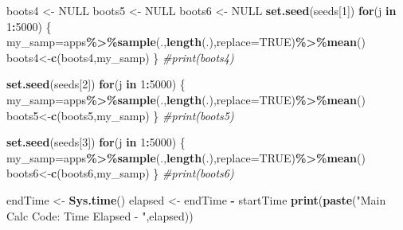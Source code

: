 \documentclass[
]{article}
\newenvironment{Shaded}{\begin{snugshade}}{\end{snugshade}}
\newcommand{\AttributeTok}[1]{\textcolor[rgb]{0.13,0.29,0.53}{#1}}
\newcommand{\CommentTok}[1]{\textcolor[rgb]{0.56,0.35,0.01}{\textit{#1}}}
\newcommand{\ConstantTok}[1]{\textcolor[rgb]{0.56,0.35,0.01}{#1}}
\newcommand{\ControlFlowTok}[1]{\textcolor[rgb]{0.13,0.29,0.53}{\textbf{#1}}}
\newcommand{\DecValTok}[1]{\textcolor[rgb]{0.00,0.00,0.81}{#1}}
\newcommand{\FunctionTok}[1]{\textcolor[rgb]{0.13,0.29,0.53}{\textbf{#1}}}
\newcommand{\NormalTok}[1]{#1}
\newcommand{\OtherTok}[1]{\textcolor[rgb]{0.56,0.35,0.01}{#1}}
\newcommand{\SpecialCharTok}[1]{\textcolor[rgb]{0.81,0.36,0.00}{\textbf{#1}}}
\newcommand{\StringTok}[1]{\textcolor[rgb]{0.31,0.60,0.02}{#1}}
\begin{document}
\begin{Shaded}
\begin{Highlighting}[]
\NormalTok{boots4 }\OtherTok{\textless{}{-}} \ConstantTok{NULL}
\NormalTok{boots5 }\OtherTok{\textless{}{-}} \ConstantTok{NULL}
\NormalTok{boots6 }\OtherTok{\textless{}{-}} \ConstantTok{NULL}
\FunctionTok{set.seed}\NormalTok{(seeds[}\DecValTok{1}\NormalTok{])}
\ControlFlowTok{for}\NormalTok{(j }\ControlFlowTok{in} \DecValTok{1}\SpecialCharTok{:}\DecValTok{5000}\NormalTok{)}
\NormalTok{\{}
\NormalTok{  my\_samp}\OtherTok{=}\NormalTok{apps}\SpecialCharTok{\%\textgreater{}\%}\FunctionTok{sample}\NormalTok{(.,}\FunctionTok{length}\NormalTok{(.),}\AttributeTok{replace=}\ConstantTok{TRUE}\NormalTok{)}\SpecialCharTok{\%\textgreater{}\%}\FunctionTok{mean}\NormalTok{()}
\NormalTok{  boots4}\OtherTok{\textless{}{-}}\FunctionTok{c}\NormalTok{(boots4,my\_samp)}
\NormalTok{\}}
\CommentTok{\#print(boots4)}

\FunctionTok{set.seed}\NormalTok{(seeds[}\DecValTok{2}\NormalTok{])}
\ControlFlowTok{for}\NormalTok{(j }\ControlFlowTok{in} \DecValTok{1}\SpecialCharTok{:}\DecValTok{5000}\NormalTok{)}
\NormalTok{\{}
\NormalTok{  my\_samp}\OtherTok{=}\NormalTok{apps}\SpecialCharTok{\%\textgreater{}\%}\FunctionTok{sample}\NormalTok{(.,}\FunctionTok{length}\NormalTok{(.),}\AttributeTok{replace=}\ConstantTok{TRUE}\NormalTok{)}\SpecialCharTok{\%\textgreater{}\%}\FunctionTok{mean}\NormalTok{()}
\NormalTok{  boots5}\OtherTok{\textless{}{-}}\FunctionTok{c}\NormalTok{(boots5,my\_samp)}
\NormalTok{\}}
\CommentTok{\#print(boots5)}

\FunctionTok{set.seed}\NormalTok{(seeds[}\DecValTok{3}\NormalTok{])}
\ControlFlowTok{for}\NormalTok{(j }\ControlFlowTok{in} \DecValTok{1}\SpecialCharTok{:}\DecValTok{5000}\NormalTok{)}
\NormalTok{\{}
\NormalTok{  my\_samp}\OtherTok{=}\NormalTok{apps}\SpecialCharTok{\%\textgreater{}\%}\FunctionTok{sample}\NormalTok{(.,}\FunctionTok{length}\NormalTok{(.),}\AttributeTok{replace=}\ConstantTok{TRUE}\NormalTok{)}\SpecialCharTok{\%\textgreater{}\%}\FunctionTok{mean}\NormalTok{()}
\NormalTok{  boots6}\OtherTok{\textless{}{-}}\FunctionTok{c}\NormalTok{(boots6,my\_samp)}
\NormalTok{\}}
\CommentTok{\#print(boots6)}

\NormalTok{endTime }\OtherTok{\textless{}{-}} \FunctionTok{Sys.time}\NormalTok{()}
\NormalTok{elapsed }\OtherTok{\textless{}{-}}\NormalTok{ endTime }\SpecialCharTok{{-}}\NormalTok{ startTime}
\FunctionTok{print}\NormalTok{(}\FunctionTok{paste}\NormalTok{(}\StringTok{"Main Calc Code: Time Elapsed {-} "}\NormalTok{,elapsed))}
\end{Highlighting}
\end{Shaded}
\end{document}
